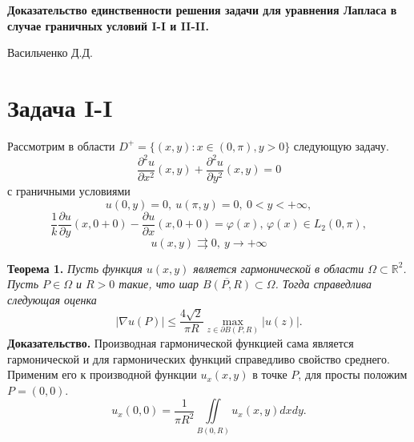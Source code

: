 \documentclass[12pt, a4paper]{article}
\author{Васильченко Д.Д.}
\begin{document}
	
	\begin{center}
		\Large\bfseries
		Доказательство единственности решения задачи для уравнения Лапласа в случае граничных условий I-I  и II-II.
	\end{center}
	
		\begin{center}
		\large Васильченко Д.Д.
	\end{center}
	\vspace{1cm}
	
	\section{Задача I-I}
	Рассмотрим в области $D^+ = \{(x,y): x \in (0,\pi), y > 0\}$ следующую задачу.
	\begin{equation}
		\dfrac{\partial^2 u}{\partial x^2}(x,y) + \dfrac{\partial^2 u}{\partial y^2}(x,y) = 0
	\end{equation}
	с граничными условиями 
	\begin{equation}
		u(0,y) = 0, \ u(\pi, y) = 0, \ 0 < y < +\infty, 
	\end{equation}
	\begin{equation}
		\dfrac{1}{k} \dfrac{\partial u}{\partial y}(x,0+0) - \dfrac{\partial u}{\partial x}(x,0+0) = \varphi(x), \,\varphi(x) \in L_2(0,\pi),
	\end{equation}
	\begin{equation}
		u(x,y) \rightrightarrows 0, \ y \to +\infty 
	\end{equation}
	
	\textbf{Теорема 1.} \textit{Пусть функция $u(x,y)$ является гармонической в области $\Omega \subset \mathbb{R}^2$. Пусть $P \in \Omega$ и $R > 0$ такие, что шар $\overline{B(P, R)} \subset \Omega$. Тогда справедлива следующая оценка
		\begin{equation*}
			|\nabla u(P)| \leq \dfrac{4\sqrt2}{\pi R} \max\limits_{z \in \partial B(P,R)} |u(z)|.
	\end{equation*}}
	\textbf{Доказательство.}
	Производная гармонической функцией сама является гармонической и для гармонических функций справедливо свойство среднего. Применим его к производной функции $u_x(x,y)$ в точке $P$, для просты положим $P = (0,0)$.
	\begin{equation*}
		u_x(0,0) = \dfrac{1}{\pi R^2} \iint\limits_{B(0,R)} u_x(x,y) dx dy.
	\end{equation*}
	
\end{document}
